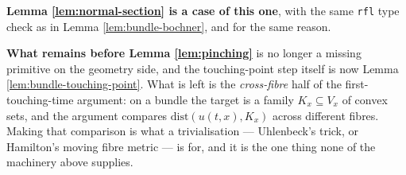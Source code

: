 \begin{lemma}
  \textbf{Lemma \ref{lem:normal-section} is a case of this one}, with the same \texttt{rfl}
  type check as in Lemma \ref{lem:bundle-bochner}, and for the same reason.

  \textbf{What remains before Lemma \ref{lem:pinching}} is no longer a missing primitive on
  the geometry side, and the touching-point step itself is now Lemma
  \ref{lem:bundle-touching-point}. What is left is the \emph{cross-fibre} half of the
  first-touching-time argument: on a bundle the target is a family $K_x \subseteq V_x$ of
  convex sets, and the argument compares $\mathrm{dist}(u(t,x), K_x)$ across different
  fibres. Making that comparison is what a trivialisation --- Uhlenbeck's trick, or
  Hamilton's moving fibre metric --- is for, and it is the one thing none of the machinery
  above supplies.
\end{lemma}

